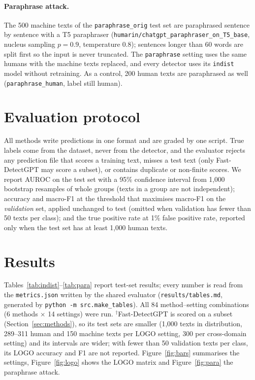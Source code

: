 \documentclass[11pt,a4paper]{article}
\begin{document}
\paragraph{Paraphrase attack.} The 500 machine texts of the \texttt{paraphrase\_orig} test set are paraphrased sentence
by sentence with a T5 paraphraser (\texttt{humarin/chatgpt\_paraphraser\_on\_T5\_base}, nucleus sampling $p=0.9$,
temperature 0.8); sentences longer than 60 words are split first so the input is never truncated. The
\texttt{paraphrase} setting uses the same humans with the machine texts replaced, and every detector uses its
\texttt{indist} model without retraining. As a control, 200 human texts are paraphrased as well
(\texttt{paraphrase\_human}, label still human).

\section{Evaluation protocol}

All methods write predictions in one format and are graded by one script. True labels come from the dataset, never
from the detector, and the evaluator rejects any prediction file that scores a training text, misses a test text (only
Fast-DetectGPT may score a subset), or contains duplicate or non-finite scores. We report AUROC on the test set with a
95\% confidence interval from 1,000 bootstrap resamples of whole groups (texts in a group are not independent);
accuracy and macro-F1 at the threshold that maximises macro-F1 on the \emph{validation} set, applied unchanged to
test (omitted when validation has fewer than 50 texts per class); and the true positive rate at 1\% false positive
rate, reported only when the test set has at least 1,000 human texts.

\section{Results}

Tables~\ref{tab:indist}--\ref{tab:para} report test-set results; every number is read from the
\texttt{metrics.json} written by the shared evaluator (\texttt{results/tables.md}, generated by
\texttt{python -m src.make\_tables}). All 84 method--setting combinations (6 methods $\times$ 14 settings) were run. $^\dagger$Fast-DetectGPT is
scored on a subset (Section~\ref{sec:methods}), so its test sets are smaller (1,000 texts in distribution, 289--311 human and 150
machine texts per LOGO setting, 300 per cross-domain setting) and its intervals are wider; with fewer than 50
validation texts per class, its LOGO accuracy and F1 are not reported. Figure~\ref{fig:bars} summarises the
settings, Figure~\ref{fig:logo} shows the LOGO matrix and Figure~\ref{fig:para} the paraphrase attack.
\end{document}
